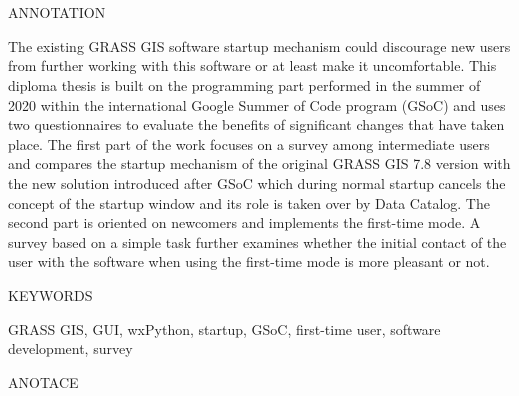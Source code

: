 \documentclass[a4paper,10pt,twoside]{article}
\begin{document}

\newpage ~ \newpage
\thispagestyle{empty}

\begin{figure}
 \centering 
 
\end{figure}


\newpage ~ \newpage
\newpage ~ \newpage
\thispagestyle{empty}


\renewcommand{\baselinestretch}{1.2} %


\begin{Large}
\noindent ANNOTATION
\end{Large}

\large
\noindent
The existing GRASS GIS software startup mechanism could discourage new users from further working with this software or at least make it uncomfortable. This diploma thesis is built on the programming part performed in the summer of 2020 within the international Google Summer of Code program (GSoC) and uses two questionnaires to evaluate the benefits of significant changes that have taken place. The first part of the work focuses on a survey among intermediate users and compares the startup mechanism of the original GRASS GIS 7.8 version with the new solution introduced after GSoC which during normal startup cancels the concept of the startup window and its role is taken over by Data Catalog. The second part is oriented on newcomers and implements the first-time mode. A survey based on a simple task further examines whether the initial contact of the user with the software when using the first-time mode is more pleasant or not.

\vspace{2ex}
\begin{Large}
\noindent KEYWORDS
\end{Large}

\large
\noindent
\textrm{GRASS GIS, GUI, wxPython, startup, GSoC, first-time user, software development, survey}

\mbox{}
\vfill

\begin{Large}
\noindent ANOTACE
\end{Large} 
\end{document}
